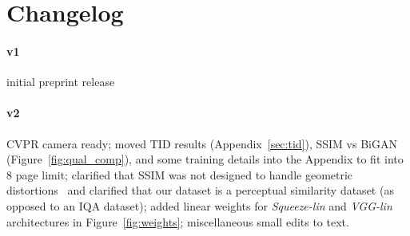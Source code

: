 \section{Changelog}
\label{sec:change}
\paragraph{v1} initial preprint release

\paragraph{v2} CVPR camera ready; moved TID results (Appendix~\ref{sec:tid}), SSIM vs BiGAN (Figure~\ref{fig:qual_comp}), and some training details into the Appendix to fit into 8 page limit; clarified that SSIM was not designed to handle geometric distortions~\cite{sampat2009complex} and clarified that our dataset is a perceptual similarity dataset (as opposed to an IQA dataset); added linear weights for \textit{Squeeze-lin} and \textit{VGG-lin} architectures in Figure~\ref{fig:weights}; miscellaneous small edits to text.
